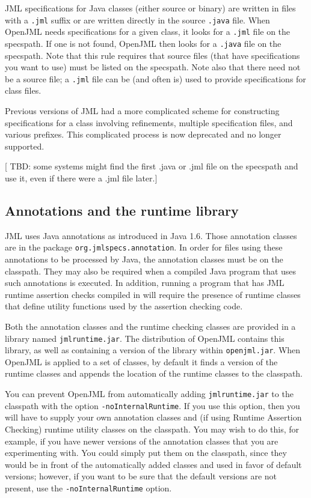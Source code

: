 JML specifications for Java classes (either source or binary) are written in files with a {\tt .jml} suffix or are written directly in the source {\tt .java} file.
When OpenJML needs specifications for a given class, it looks for a {\tt .jml} file on the specspath. If one is not found, OpenJML then looks for a {\tt .java}
file on the specspath. Note that this rule requires that source files (that have specifications you want to use) must be listed on the specspath. Note also that there 
need not be a source file; a {\tt .jml} file can be (and often is) used to provide specifications for class files.

Previous versions of JML had a more complicated scheme for constructing specifications for a class involving refinements, multiple specification files, and various prefixes. This complicated process is now deprecated and no longer supported.

[ TBD: some systems might find the first .java or .jml file on the specspath and use it, even if there were a .jml file later.]


\subsection{Annotations and the runtime library}

JML uses Java annotations as introduced in Java 1.6. Those annotation classes are in the package
{\tt org.jmlspecs.annotation}. In order for files using these annotations to be processed by Java,
the annotation classes must be on the classpath. They may also be required when a compiled Java program
that uses such annotations is executed. In addition, running a program that has JML runtime assertion
checks compiled in will require the presence of runtime classes that define utility functions used by the assertion checking code.

Both the annotation classes and the runtime checking classes are provided in a library named {\tt jmlruntime.jar}.  The distribution of OpenJML contains this library, as well as containing a
version of the library within {\tt openjml.jar}. When OpenJML is applied to a set of classes, by default it finds a version of the runtime classes and appends the location of the runtime classes
to the classpath.

You can prevent OpenJML from automatically adding {\tt jmlruntime.jar} to the classpath with the
option {\tt -noInternalRuntime}. If you use this option, then you will have to supply your own
annotation classes and (if using Runtime Assertion Checking) runtime utility classes on the classpath. You may wish to do this, for example, if you have newer versions of the annotation
classes that you are experimenting with. You could simply put them on the classpath, since they
would be in front of the automatically added classes and used in favor of default versions;
however, if you want to be sure that the default versions are not present, use the {\tt -noInternalRuntime} option.

